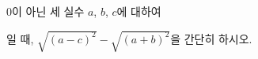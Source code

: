 0이 아닌 세 실수 $a$, $b$, $c$에 대하여 \par\smallskip{}\par\smallskip\noindent 일 때, $\sqrt{(a-c)^2}-\sqrt{(a+b)^2}$을 간단히 하시오.
